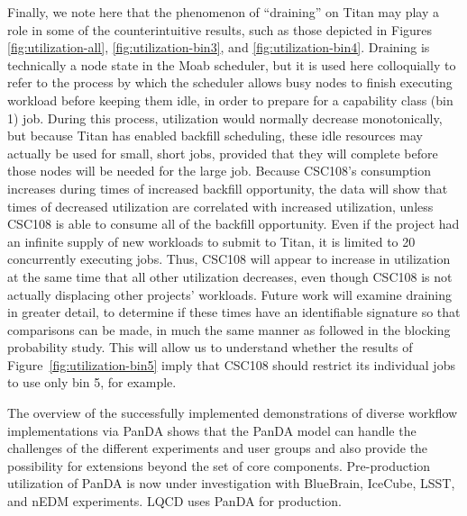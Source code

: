 Finally, we note here that the phenomenon of ``draining'' on Titan may play a
role in some of the counterintuitive results, such as those depicted in Figures
\ref{fig:utilization-all}, \ref{fig:utilization-bin3}, and
\ref{fig:utilization-bin4}. Draining is technically a node state in the Moab
scheduler, but it is used here colloquially to refer to the process by which
the scheduler allows busy nodes to finish executing workload before keeping
them idle, in order to prepare for a capability class (bin 1) job. During this
process, utilization would normally decrease monotonically, but because Titan
has enabled backfill scheduling, these idle resources may actually be used for
small, short jobs, provided that they will complete before those nodes will be
needed for the large job. Because CSC108's consumption increases during times
of increased backfill opportunity, the data will show that times of decreased
utilization are correlated with increased utilization, unless CSC108 is able to
consume all of the backfill opportunity. Even if the project had an infinite
supply of new workloads to submit to Titan, it is limited to 20 concurrently
executing jobs. Thus, CSC108 will appear to increase in utilization at the
same time that all other utilization decreases, even though CSC108 is not
actually displacing other projects' workloads. Future work will examine
draining in greater detail, to determine if these times have an identifiable
signature so that comparisons can be made, in much the same manner as followed
in the blocking probability study. This will allow us to understand whether
the results of Figure~\ref{fig:utilization-bin5} imply that CSC108 should
restrict its individual jobs to use only bin 5, for example.


The overview of the successfully implemented demonstrations of diverse
workflow implementations via PanDA shows that the PanDA model can handle the
challenges of the different experiments and user groups and also provide the
possibility for extensions beyond the set of core components. Pre-production
utilization of PanDA is now under investigation with BlueBrain, IceCube, LSST,
and nEDM experiments. LQCD uses PanDA for production.

